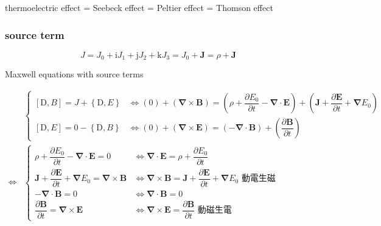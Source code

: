 \documentclass[
]{book}
\theoremstyle{definition}
\theoremstyle{definition}
\theoremstyle{definition}
\theoremstyle{definition}
\theoremstyle{remark}
\begin{document}
thermoelectric effect = Seebeck effect = Peltier effect = Thomson effect

\subsubsection{source term}\label{source-term}

\[
J=J_{{\scriptscriptstyle 0}}+\mathrm{i}J_{{\scriptscriptstyle 1}}+\mathrm{j}J_{{\scriptscriptstyle 2}}+\mathrm{k}J_{{\scriptscriptstyle 3}}=J_{{\scriptscriptstyle 0}}+\boldsymbol{J}=\rho+\boldsymbol{J}
\]

Maxwell equations with source terms

\begin{CJK}{UTF8}{bsmi}
$$
\begin{aligned}
 & \begin{cases}
\left[\mathrm{D},B\right]=J+\left\{ \mathrm{D},E\right\}  & \Leftrightarrow\left(0\right)+\left(\boldsymbol{\nabla}\times\boldsymbol{B}\right)=\left(\rho+\dfrac{\partial E_{{\scriptscriptstyle 0}}}{\partial t}-\boldsymbol{\nabla}\cdot\boldsymbol{E}\right)+\left(\boldsymbol{J}+\dfrac{\partial\boldsymbol{E}}{\partial t}+\boldsymbol{\nabla}E_{{\scriptscriptstyle 0}}\right)\\
\left[\mathrm{D},E\right]=0-\left\{ \mathrm{D},B\right\}  & \Leftrightarrow\left(0\right)+\left(\boldsymbol{\nabla}\times\boldsymbol{E}\right)=\left(-\boldsymbol{\nabla}\cdot\boldsymbol{B}\right)+\left(\dfrac{\partial\boldsymbol{B}}{\partial t}\right)
\end{cases}\\
\Leftrightarrow & \begin{cases}
\rho+\dfrac{\partial E_{{\scriptscriptstyle 0}}}{\partial t}-\boldsymbol{\nabla}\cdot\boldsymbol{E}=0 & \Leftrightarrow\boldsymbol{\nabla}\cdot\boldsymbol{E}=\rho+\dfrac{\partial E_{{\scriptscriptstyle 0}}}{\partial t}\\
\boldsymbol{J}+\dfrac{\partial\boldsymbol{E}}{\partial t}+\boldsymbol{\nabla}E_{{\scriptscriptstyle 0}}=\boldsymbol{\nabla}\times\boldsymbol{B} & \Leftrightarrow\boldsymbol{\nabla}\times\boldsymbol{B}=\boldsymbol{J}+\dfrac{\partial\boldsymbol{E}}{\partial t}+\boldsymbol{\nabla}E_{{\scriptscriptstyle 0}}\text{ 動電生磁}\\
-\boldsymbol{\nabla}\cdot\boldsymbol{B}=0 & \Leftrightarrow\boldsymbol{\nabla}\cdot\boldsymbol{B}=0\\
\dfrac{\partial\boldsymbol{B}}{\partial t}=\boldsymbol{\nabla}\times\boldsymbol{E} & \Leftrightarrow\boldsymbol{\nabla}\times\boldsymbol{E}=\dfrac{\partial\boldsymbol{B}}{\partial t}\text{ 動磁生電}
\end{cases}
\end{aligned}
$$
\end{CJK}
\end{document}
